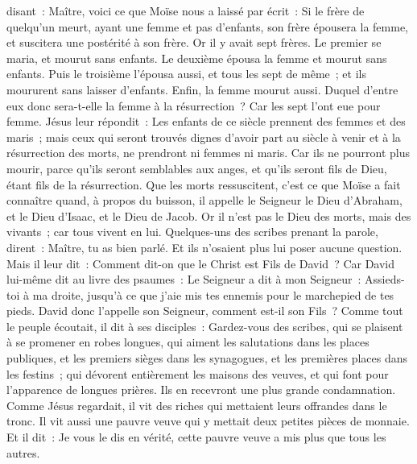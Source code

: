 \begin{multicols}{2}
disant~: Maître, voici ce que Moïse nous a laissé par écrit~: Si le frère de quelqu'un meurt, ayant une femme et pas d'enfants, son frère épousera la femme, et suscitera une postérité à son frère.
Or il y avait sept frères. Le premier se maria, et mourut sans enfants.
Le deuxième épousa la femme et mourut sans enfants.
Puis le troisième l'épousa aussi, et tous les sept de même~; et ils moururent sans laisser d'enfants.
Enfin, la femme mourut aussi.
Duquel d'entre eux donc sera-t-elle la femme à la résurrection~? Car les sept l'ont eue pour femme.
Jésus leur répondit~: Les enfants de ce siècle prennent des femmes et des maris~;
mais ceux qui seront trouvés dignes d'avoir part au siècle à venir et à la résurrection des morts, ne prendront ni femmes ni maris.
Car ils ne pourront plus mourir, parce qu'ils seront semblables aux anges, et qu'ils seront fils de Dieu, étant fils de la résurrection.
Que les morts ressuscitent, c'est ce que Moïse a fait connaître quand, à propos du buisson, il appelle le Seigneur le Dieu d'Abraham, et le Dieu d'Isaac, et le Dieu de Jacob.
Or il n'est pas le Dieu des morts, mais des vivants~; car tous vivent en lui.
Quelques-uns des scribes prenant la parole, dirent~: Maître, tu as bien parlé.
Et ils n'osaient plus lui poser aucune question.
Mais il leur dit~: Comment dit-on que le Christ est Fils de David~?
Car David lui-même dit au livre des psaumes~: Le Seigneur a dit à mon Seigneur~: Assieds-toi à ma droite,
jusqu'à ce que j'aie mis tes ennemis pour le marchepied de tes pieds.
David donc l'appelle son Seigneur, comment est-il son Fils~?
Comme tout le peuple écoutait, il dit à ses disciples~:
Gardez-vous des scribes, qui se plaisent à se promener en robes longues, qui aiment les salutations dans les places publiques, et les premiers sièges dans les synagogues, et les premières places dans les festins~;
qui dévorent entièrement les maisons des veuves, et qui font pour l'apparence de longues prières. Ils en recevront une plus grande condamnation.
\VerseOne{}Comme Jésus regardait, il vit des riches qui mettaient leurs offrandes dans le tronc.
Il vit aussi une pauvre veuve qui y mettait deux petites pièces de monnaie.
Et il dit~: Je vous le dis en vérité, cette pauvre veuve a mis plus que tous les autres.

\end{multicols}
